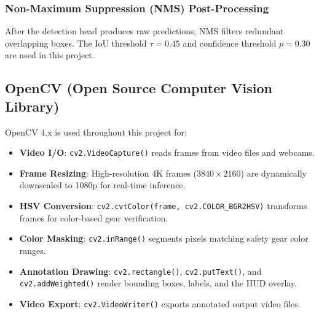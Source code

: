 \documentclass[12pt,a4paper]{report}
\begin{document}
\subsubsection*{Non-Maximum Suppression (NMS) Post-Processing}
After the detection head produces raw predictions, NMS filters redundant overlapping boxes. The IoU threshold $\tau = 0.45$ and confidence threshold $p = 0.30$ are used in this project.

\subsection{OpenCV (Open Source Computer Vision Library)}
OpenCV 4.x is used throughout this project for:
\begin{itemize}
    \item \textbf{Video I/O}: \texttt{cv2.VideoCapture()} reads frames from video files and webcams.
    \item \textbf{Frame Resizing}: High-resolution 4K frames ($3840 \times 2160$) are dynamically downscaled to 1080p for real-time inference.
    \item \textbf{HSV Conversion}: \texttt{cv2.cvtColor(frame, cv2.COLOR\_BGR2HSV)} transforms frames for color-based gear verification.
    \item \textbf{Color Masking}: \texttt{cv2.inRange()} segments pixels matching safety gear color ranges.
    \item \textbf{Annotation Drawing}: \texttt{cv2.rectangle()}, \texttt{cv2.putText()}, and \texttt{cv2.addWeighted()} render bounding boxes, labels, and the HUD overlay.
    \item \textbf{Video Export}: \texttt{cv2.VideoWriter()} exports annotated output video files.
\end{itemize}
\end{document}
